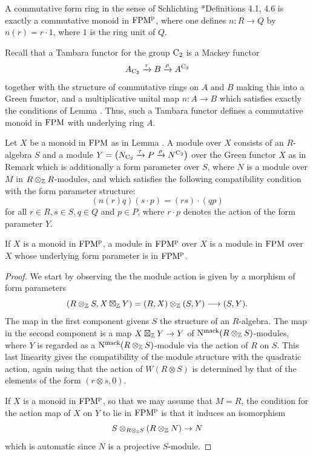 \begin{example}%
\label{example:formrings}%
A commutative form ring in the sense of Schlichting \cite{SchlichtinghigherI}*{Definitions 4.1, 4.6} is exactly a commutative monoid in $\mathrm {FPM}^{\mathrm p}$, where one defines $n\colon R\to Q$ by $n(r)=r\cdot 1$, where $1$ is the ring unit of $Q$.
\end{example}

\begin{example} 
Recall that a Tambara functor for the group $\mathrm{C_2}$ is a Mackey functor
\[
A_{\mathrm{C_2}}\xrightarrow{\tau}B\xrightarrow{\rho}A^{\mathrm{C_2}}
\]
together with the structure of commutative rings on $A$ and $B$ making this into a Green functor, and a multiplicative unital map $n\colon A\to B$ which satisfies exactly the conditions of Lemma . Thus, such a Tambara functor defines a commutative monoid in $\mathrm {FPM}$ with underlying ring $A$.
\end{example}


\begin{lemma}%
\label{lemma:modulesFPM}%
Let $X$ be a monoid in $\mathrm {FPM}$ as in Lemma .
A module over $X$ consists of an $R$-algebra $S$ and a module 
$
Y=\big(N_{\mathrm{C_2}}\xrightarrow{\tau}P\xrightarrow{\rho}N^{\mathrm{C_2}}\big)
$
over the Green functor $X$ as in Remark  which is additionally a form parameter over $S$, where $N$ is a module over $M$ in $R\otimes_{\mathbb{Z}} R$-modules, and which satisfies the following compatibility condition with the form parameter structure:
\[
(n(r)q)(s\cdot p)=(rs)\cdot (qp)
\]
for all $r\in R, s\in S, q\in Q$ and $p\in P$, where $r\cdot p$ denotes the action of the form parameter $Y$.

If $X$ is a monoid in $\mathrm {FPM}^{\mathrm p}$, a module in $\mathrm {FPM}^{\mathrm p}$ over $X$ is a module in $\mathrm {FPM}$ over $X$ whose underlying form parameter is in $\mathrm {FPM}^{\mathrm p}$. 
\end{lemma}
\begin{proof}
We start by observing the the module action is given by a morphism of form parameters
\[
(R\otimes_{\mathbb{Z}} S,X\boxtimes_{\mathbb{Z}} Y)=(R,X)\otimes_{\mathbb{Z}} (S,Y)\longrightarrow (S,Y).
\]
The map in the first component givens $S$ the structure of an $R$-algebra. The map in the second component is a map $X\boxtimes_{\mathbb{Z}} Y\to Y$ of $\mathrm{N}^{\mathrm{mack}}(R\otimes_{\mathbb{Z}} S)$-modules, where $Y$ is regarded as a $\mathrm{N}^{\mathrm{mack}}(R\otimes_{\mathbb{Z}} S)$-module via the action of $R$ on $S$. This last linearity gives the compatibility of the module structure with the quadratic action, again using that the action of $W(R\otimes S)$ is determined by that of the elements of the form $(r\otimes s,0)$.

If $X$ is a monoid in $\mathrm {FPM}^{\mathrm p}$, so that we may assume that $M=R$, the condition for the action map of $X$ on $Y$ to lie in $\mathrm {FPM}^{\mathrm p}$ is that it induces an isomorphism
\[
S\otimes_{R\otimes_{\mathbb{Z}} S}(R\otimes_{\mathbb{Z}} N)\to N
\]
which is automatic since $N$ is a projective $S$-module. 
\end{proof}


